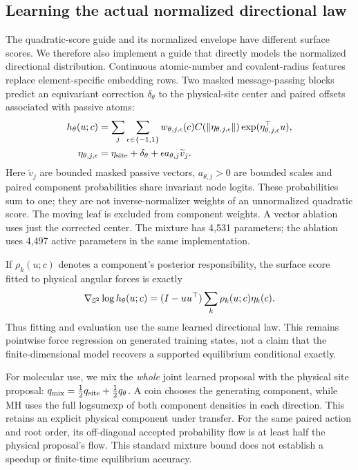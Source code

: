 \subsection{Learning the actual normalized directional law}
The quadratic-score guide and its normalized envelope have different surface
scores. We therefore also implement a guide that directly models the normalized
directional distribution. Continuous atomic-number and covalent-radius features
replace element-specific embedding rows. Two masked message-passing blocks predict
an equivariant correction $\delta_\theta$ to the physical-site center and paired
offsets associated with passive atoms:
\begin{equation}
 \begin{aligned}
 h_\theta(u;c)&=\sum_j\sum_{\epsilon\in\{-1,1\}}
 w_{\theta,j,\epsilon}(c) C(\|\eta_{\theta,j,\epsilon}\|)
 \exp(\eta_{\theta,j,\epsilon}^{\top}u),\\
 \eta_{\theta,j,\epsilon}&=\eta_{\rm site}+\delta_\theta+
 \epsilon a_{\theta,j}\widetilde v_j.
 \end{aligned}
\end{equation}
Here $\widetilde v_j$ are bounded masked passive vectors, $a_{\theta,j}>0$ are
bounded scales and paired component probabilities share invariant node logits.
These probabilities sum to one; they are not inverse-normalizer weights of an
unnormalized quadratic score. The moving leaf is excluded from component weights.
A vector ablation uses just the corrected center. The mixture has 4,531 parameters;
the ablation uses 4,497 active parameters in the same implementation.

If $\rho_k(u;c)$ denotes a component's posterior responsibility, the surface
score fitted to physical angular forces is exactly
\begin{equation}
 \nabla_{\mathbb S^2}\log h_\theta(u;c)
 =(I-uu^\top)\sum_k\rho_k(u;c)\eta_k(c).
\end{equation}
Thus fitting and evaluation use the same learned directional law. This remains
pointwise force regression on generated training states, not a claim that the
finite-dimensional model recovers a supported equilibrium conditional exactly.

For molecular use, we mix the \emph{whole} joint learned proposal with the physical
site proposal: $q_{\rm mix}=\tfrac12 q_{\rm site}+\tfrac12 q_\theta$. A coin chooses
the generating component, while MH uses the full logsumexp of both component
densities in each direction. This retains an explicit physical component under
transfer. For the same paired action and root order, its off-diagonal accepted
probability flow is at least half the physical proposal's flow. This standard
mixture bound does not establish a speedup or finite-time equilibrium accuracy.

